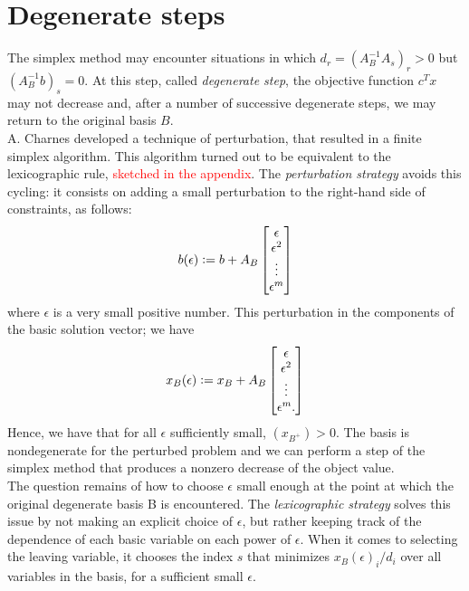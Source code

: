 \documentclass[a4paper,10 pt,titlepage,twoside]{book}
\theoremstyle{plain}
\theoremstyle{definition}
\theoremstyle{remark}
\begin{document}
 \section{Degenerate steps}
The simplex method may encounter situations in which $d_{r} = \left( A_{B}^{-1}A_{s}\right)_{r} > 0$ but $(A_{B}^{-1}b)_{s}= 0$. At this step, called \textit{degenerate step}, the objective function $c^{T}x$ may not decrease and, after a number of successive degenerate steps, we may return to the original basis $B$. \\
A. Charnes \cite{Lexico2} developed a technique of perturbation, that resulted in a finite simplex algorithm. This algorithm turned out to be equivalent to the lexicographic rule, \textcolor{red}{sketched in the appendix}. The \textit{perturbation strategy} avoids this cycling: it consists on adding a small perturbation to the right-hand side of constraints, as follows:
\begin{equation*}
b(\epsilon) \vcentcolon= b + A_{B}
\begin{bmatrix}
\epsilon\\\epsilon^{2}\\\vdots\\\epsilon^{m}
\end{bmatrix}
\end{equation*}
where $\epsilon$ is a very small positive number. This perturbation in the components of the basic solution vector; we have
\begin{equation*}x_{B}(\epsilon) \vcentcolon= x_{B} + A_{B}
\begin{bmatrix}
\epsilon\\\epsilon^{2}\\\vdots\\\epsilon^{m}.
\end{bmatrix}
\end{equation*}
Hence, we have that for all $\epsilon$ sufficiently small, $(x_{B^{+}})>0$. The basis is nondegenerate for the perturbed problem and we can perform a step of the simplex method that produces a nonzero decrease of the object value.\\
The question remains of how to choose $\epsilon$ small enough at the point at which the original degenerate basis B is encountered. The \textit{lexicographic strategy} solves this issue by not making an explicit choice of $\epsilon$, but rather keeping track of the dependence of each basic variable on each power of $\epsilon$. When it comes to selecting the leaving variable, it chooses the index $s$ that minimizes $x_{B}(\epsilon)_{i}/d_{i}$ over all variables in the basis, for a sufficient small $\epsilon$.\\
\end{document}
